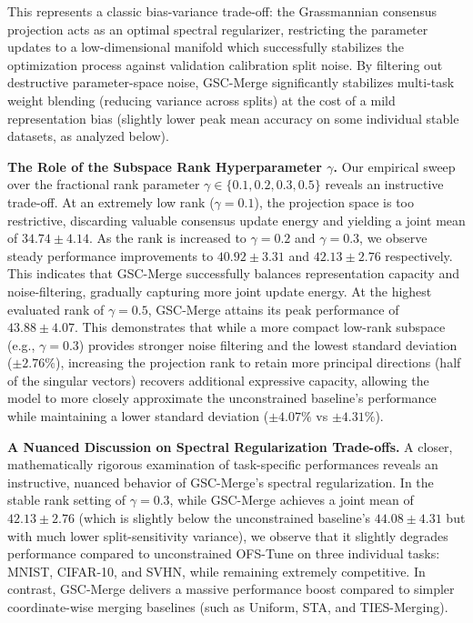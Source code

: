 This represents a classic bias-variance trade-off: the Grassmannian consensus projection acts as an optimal spectral regularizer, restricting the parameter updates to a low-dimensional manifold which successfully stabilizes the optimization process against validation calibration split noise. By filtering out destructive parameter-space noise, GSC-Merge significantly stabilizes multi-task weight blending (reducing variance across splits) at the cost of a mild representation bias (slightly lower peak mean accuracy on some individual stable datasets, as analyzed below).

\textbf{The Role of the Subspace Rank Hyperparameter $\gamma$.}
Our empirical sweep over the fractional rank parameter $\gamma \in \{0.1, 0.2, 0.3, 0.5\}$ reveals an instructive trade-off. At an extremely low rank ($\gamma=0.1$), the projection space is too restrictive, discarding valuable consensus update energy and yielding a joint mean of $34.74 \pm 4.14$. As the rank is increased to $\gamma=0.2$ and $\gamma=0.3$, we observe steady performance improvements to $40.92 \pm 3.31$ and $42.13 \pm 2.76$ respectively. This indicates that GSC-Merge successfully balances representation capacity and noise-filtering, gradually capturing more joint update energy. At the highest evaluated rank of $\gamma=0.5$, GSC-Merge attains its peak performance of $43.88 \pm 4.07$. This demonstrates that while a more compact low-rank subspace (e.g., $\gamma=0.3$) provides stronger noise filtering and the lowest standard deviation ($\pm 2.76\%$), increasing the projection rank to retain more principal directions (half of the singular vectors) recovers additional expressive capacity, allowing the model to more closely approximate the unconstrained baseline's performance while maintaining a lower standard deviation ($\pm 4.07\%$ vs $\pm 4.31\%$).

\textbf{A Nuanced Discussion on Spectral Regularization Trade-offs.}
A closer, mathematically rigorous examination of task-specific performances reveals an instructive, nuanced behavior of GSC-Merge's spectral regularization. In the stable rank setting of $\gamma = 0.3$, while GSC-Merge achieves a joint mean of $42.13 \pm 2.76$ (which is slightly below the unconstrained baseline's $44.08 \pm 4.31$ but with much lower split-sensitivity variance), we observe that it slightly degrades performance compared to unconstrained OFS-Tune on three individual tasks: MNIST, CIFAR-10, and SVHN, while remaining extremely competitive. In contrast, GSC-Merge delivers a massive performance boost compared to simpler coordinate-wise merging baselines (such as Uniform, STA, and TIES-Merging).


